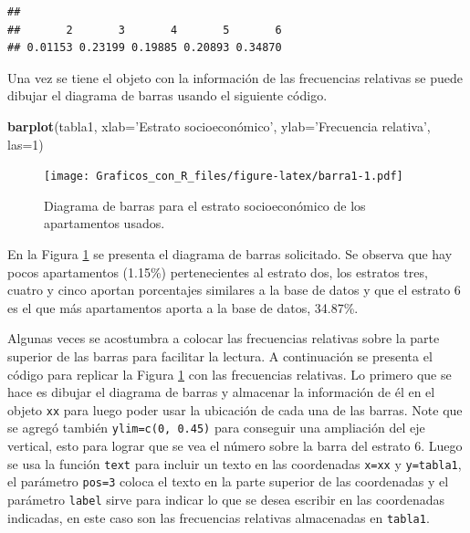 \documentclass[10pt,]{krantz}
\makeatletter
\newenvironment{Shaded}{\begin{snugshade}}{\end{snugshade}}
\newcommand{\KeywordTok}[1]{\textcolor[rgb]{0.13,0.29,0.53}{\textbf{{#1}}}}
\newcommand{\DataTypeTok}[1]{\textcolor[rgb]{0.13,0.29,0.53}{{#1}}}
\newcommand{\DecValTok}[1]{\textcolor[rgb]{0.00,0.00,0.81}{{#1}}}
\newcommand{\StringTok}[1]{\textcolor[rgb]{0.31,0.60,0.02}{{#1}}}
\newcommand{\NormalTok}[1]{{#1}}
\newenvironment{kframe}{%
\medskip{}
\setlength{\fboxsep}{.8em}
 \def\at@end@of@kframe{}%
 \ifinner\ifhmode%
  \def\at@end@of@kframe{\end{minipage}}%
  \begin{minipage}{\columnwidth}%
 \fi\fi%
 \def\FrameCommand##1{\hskip\@totalleftmargin \hskip-\fboxsep
 \colorbox{shadecolor}{##1}\hskip-\fboxsep
     \hskip-\linewidth \hskip-\@totalleftmargin \hskip\columnwidth}%
 \MakeFramed {\advance\hsize-\width
   \@totalleftmargin\z@ \linewidth\hsize
   \@setminipage}}%
 {\par\unskip\endMakeFramed%
 \at@end@of@kframe}
\renewenvironment{Shaded}{\begin{kframe}}{\end{kframe}}
\makeatother
\begin{document}
\begin{verbatim}
## 
##       2       3       4       5       6 
## 0.01153 0.23199 0.19885 0.20893 0.34870
\end{verbatim}

Una vez se tiene el objeto con la información de las frecuencias
relativas se puede dibujar el diagrama de barras usando el siguiente
código.

\begin{Shaded}
\begin{Highlighting}[]
\KeywordTok{barplot}\NormalTok{(tabla1, }\DataTypeTok{xlab=}\StringTok{'Estrato socioeconómico'}\NormalTok{,}
        \DataTypeTok{ylab=}\StringTok{'Frecuencia relativa'}\NormalTok{, }\DataTypeTok{las=}\DecValTok{1}\NormalTok{)}
\end{Highlighting}
\end{Shaded}

\begin{figure}[htbp]
\centering
\texttt{[image: Graficos\_con\_R\_files/figure-latex/barra1-1.pdf]}
\caption{\label{fig:barra1}Diagrama de barras para el estrato socioeconómico
de los apartamentos usados.}
\end{figure}

En la Figura \ref{fig:barra1} se presenta el diagrama de barras
solicitado. Se observa que hay pocos apartamentos (1.15\%)
pertenecientes al estrato dos, los estratos tres, cuatro y cinco aportan
porcentajes similares a la base de datos y que el estrato 6 es el que
más apartamentos aporta a la base de datos, 34.87\%.

Algunas veces se acostumbra a colocar las frecuencias relativas sobre la
parte superior de las barras para facilitar la lectura. A continuación
se presenta el código para replicar la Figura \ref{fig:barra1} con las
frecuencias relativas. Lo primero que se hace es dibujar el diagrama de
barras y almacenar la información de él en el objeto \texttt{xx} para
luego poder usar la ubicación de cada una de las barras. Note que se
agregó también \texttt{ylim=c(0,\ 0.45)} para conseguir una ampliación
del eje vertical, esto para lograr que se vea el número sobre la barra
del estrato 6. Luego se usa la función \texttt{text} para incluir un
texto en las coordenadas \texttt{x=xx} y \texttt{y=tabla1}, el parámetro
\texttt{pos=3} coloca el texto en la parte superior de las coordenadas y
el parámetro \texttt{label} sirve para indicar lo que se desea escribir
en las coordenadas indicadas, en este caso son las frecuencias relativas
almacenadas en \texttt{tabla1}.
\end{document}
